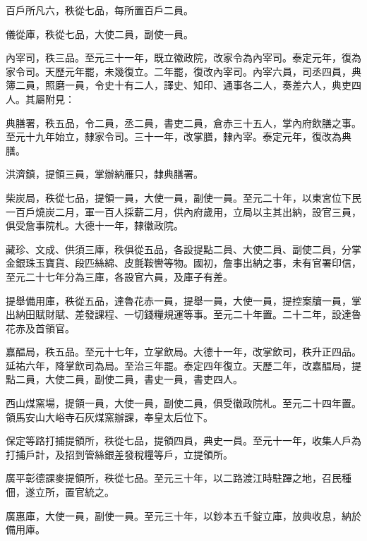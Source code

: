 \begin{pinyinscope}
 百戶所凡六，秩從七品，每所置百戶二員。



 儀從庫，秩從七品，大使二員，副使一員。



 內宰司，秩三品。至元三十一年，既立徽政院，改家令為內宰司。泰定元年，復為家令司。天歷元年罷，未幾復立。二年罷，復改內宰司。內宰六員，司丞四員，典簿二員，照磨一員，令史十有二人，譯史、知印、通事各二人，奏差六人，典吏四人。其屬附見：



 典膳署，秩五品，令二員，丞二員，書吏二員，倉赤三十五人，掌內府飲膳之事。至元十九年始立，隸家令司。三十一年，改掌膳，隸內宰。泰定元年，復改為典膳。



 洪濟鎮，提領三員，掌辦納雁只，隸典膳署。



 柴炭局，秩從七品，提領一員，大使一員，副使一員。至元二十年，以東宮位下民一百戶燒炭二月，軍一百人採薪二月，供內府歲用，立局以主其出納，設官三員，俱受詹事院札。大德十一年，隸徽政院。



 藏珍、文成、供須三庫，秩俱從五品，各設提點二員、大使二員、副使二員，分掌金銀珠玉寶貨、段匹絲綿、皮氈鞍轡等物。國初，詹事出納之事，未有官署印信，至元二十七年分為三庫，各設官六員，及庫子有差。



 提舉備用庫，秩從五品，達魯花赤一員，提舉一員，大使一員，提控案牘一員，掌出納田賦財賦、差發課程、一切錢糧規運等事。至元二十年置。二十二年，設達魯花赤及首領官。



 嘉醖局，秩五品。至元十七年，立掌飲局。大德十一年，改掌飲司，秩升正四品。延祐六年，降掌飲司為局。至治三年罷。泰定四年復立。天歷二年，改嘉醖局，提點二員，大使二員，副使二員，書史一員，書吏四人。



 西山煤窯場，提領一員，大使一員，副使二員，俱受徽政院札。至元二十四年置。領馬安山大峪寺石灰煤窯辦課，奉皇太后位下。



 保定等路打捕提領所，秩從七品，提領四員，典史一員。至元十一年，收集人戶為打捕戶計，及招到管絲銀差發稅糧等戶，立提領所。



 廣平彰德課麥提領所，秩從七品。至元三十年，以二路渡江時駐蹕之地，召民種佃，遂立所，置官統之。



 廣惠庫，大使一員，副使一員。至元三十年，以鈔本五千錠立庫，放典收息，納於備用庫。




\end{pinyinscope}
